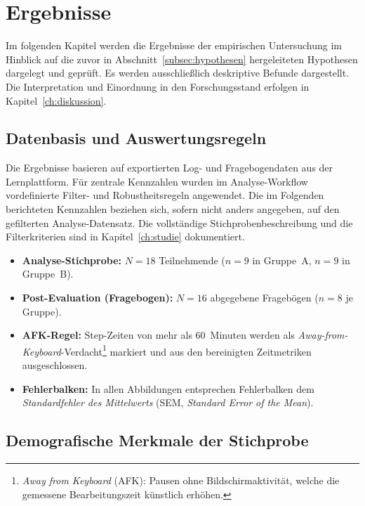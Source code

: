 \clearpage

\chapter{\textbf{Ergebnisse}}\label{ch:ergebnisse}

Im folgenden Kapitel werden die Ergebnisse der empirischen Untersuchung im Hinblick auf die zuvor in Abschnitt~\ref{subsec:hypothesen} hergeleiteten Hypothesen dargelegt und geprüft. Es werden ausschließlich deskriptive Befunde dargestellt. Die Interpretation und Einordnung in den Forschungsstand erfolgen in Kapitel~\ref{ch:diskussion}.

\section{Datenbasis und Auswertungsregeln}\label{sec:datenbasis}

Die Ergebnisse basieren auf exportierten Log- und Fragebogendaten aus der Lernplattform. Für zentrale Kennzahlen wurden im Analyse-Workflow vordefinierte Filter- und Robustheitsregeln angewendet. Die im Folgenden berichteten Kennzahlen beziehen sich, sofern nicht anders angegeben, auf den gefilterten Analyse-Datensatz. Die vollständige Stichprobenbeschreibung und die Filterkriterien sind in Kapitel~\ref{ch:studie} dokumentiert.

\begin{itemize}
    \item \textbf{Analyse-Stichprobe:} \(N = 18\) Teilnehmende (\(n = 9\) in Gruppe~A, \(n = 9\) in Gruppe~B).
    \item \textbf{Post-Evaluation (Fragebogen):} \(N = 16\) abgegebene Fragebögen (\(n = 8\) je Gruppe).
    \item \textbf{AFK-Regel:} Step-Zeiten von mehr als 60~Minuten werden als \textit{Away-from-Keyboard}-Ver\-dacht\footnote{\textit{Away from Keyboard} (AFK): Pausen ohne Bildschirmaktivität, welche die gemessene Bearbeitungszeit künstlich erhöhen.} markiert und aus den bereinigten Zeitmetriken ausgeschlossen.
    \item \textbf{Fehlerbalken:} In allen Abbildungen entsprechen Fehlerbalken dem \textit{Standardfehler des Mittelwerts} (SEM, \textit{Standard Error of the Mean}).
\end{itemize}


\section{Demografische Merkmale der Stichprobe}\label{sec:demographics}

